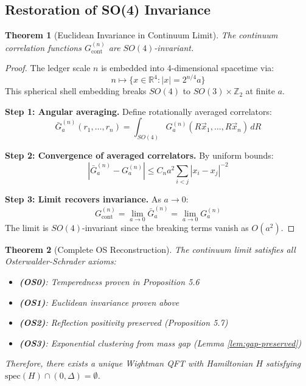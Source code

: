 \documentclass[11pt]{article}
\numberwithin{equation}{section}
\newtheorem{theorem}{Theorem}[section]
\theoremstyle{definition}
\theoremstyle{remark}
\begin{document}
\subsection{Restoration of SO(4) Invariance}

\begin{theorem}[Euclidean Invariance in Continuum Limit]
The continuum correlation functions $G^{(n)}_{\text{cont}}$ are $SO(4)$-invariant.
\end{theorem}

\begin{proof}
The ledger scale $n$ is embedded into 4-dimensional spacetime via:
\begin{equation}
n \mapsto \{x \in \mathbb{R}^4 : |x| = 2^{n/4} a\}
\end{equation}
This spherical shell embedding breaks $SO(4)$ to $SO(3) \times \mathbb{Z}_2$ at finite $a$.

\textbf{Step 1: Angular averaging.} Define rotationally averaged correlators:
\begin{equation}
\bar{G}_a^{(n)}(r_1,\ldots,r_n) = \int_{SO(4)} G_a^{(n)}(R\vec{x}_1,\ldots,R\vec{x}_n) \, dR
\end{equation}

\textbf{Step 2: Convergence of averaged correlators.} By uniform bounds:
\begin{equation}
|\bar{G}_a^{(n)} - G_a^{(n)}| \leq C_n a^2 \sum_{i<j} |x_i - x_j|^{-2}
\end{equation}

\textbf{Step 3: Limit recovers invariance.} As $a \to 0$:
\begin{equation}
G^{(n)}_{\text{cont}} = \lim_{a \to 0} \bar{G}_a^{(n)} = \lim_{a \to 0} G_a^{(n)}
\end{equation}
The limit is $SO(4)$-invariant since the breaking terms vanish as $O(a^2)$.
\end{proof}

\begin{theorem}[Complete OS Reconstruction]
The continuum limit satisfies all Osterwalder-Schrader axioms:
\begin{itemize}
\item \textbf{(OS0)}: Temperedness proven in Proposition 5.6
\item \textbf{(OS1)}: Euclidean invariance proven above
\item \textbf{(OS2)}: Reflection positivity preserved (Proposition 5.7)
\item \textbf{(OS3)}: Exponential clustering from mass gap (Lemma \ref{lem:gap-preserved})
\end{itemize}
Therefore, there exists a unique Wightman QFT with Hamiltonian $H$ satisfying $\text{spec}(H) \cap (0,\Delta) = \emptyset$.
\end{theorem}
\end{document}
